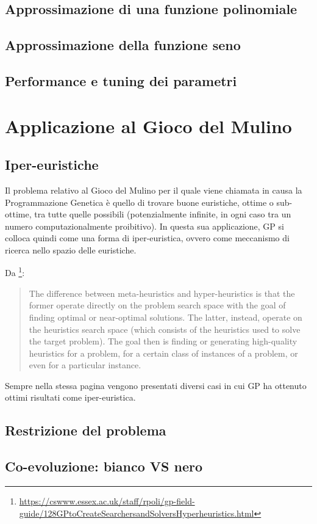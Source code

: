 \documentclass{../llncs}
\begin{document}
\subsection{Approssimazione di una funzione polinomiale}
\subsection{Approssimazione della funzione seno}
\subsection{Performance e tuning dei parametri}

\section{Applicazione al Gioco del Mulino}
\subsection{Iper-euristiche}
Il problema relativo al Gioco del Mulino per il quale viene chiamata in causa la Programmazione Genetica è quello di trovare buone euristiche, ottime o sub-ottime, tra tutte quelle possibili (potenzialmente infinite, in ogni caso tra un numero computazionalmente proibitivo). In questa sua applicazione, GP si colloca quindi come una forma di iper-euristica, ovvero come meccanismo di ricerca nello spazio delle euristiche.

Da \footnote{\url{https://cswww.essex.ac.uk/staff/rpoli/gp-field-guide/128GPtoCreateSearchersandSolversHyperheuristics.html}}:
\begin{quote}
The difference between meta-heuristics and hyper-heuristics is that the former operate directly on the problem search space with the goal of finding optimal or near-optimal solutions. The latter, instead, operate on the heuristics search space (which consists of the heuristics used to solve the target problem). The goal then is finding or generating high-quality heuristics for a problem, for a certain class of instances of a problem, or even for a particular instance.
\end{quote}
Sempre nella stessa pagina vengono presentati diversi casi in cui GP ha ottenuto ottimi risultati come iper-euristica.

\subsection{Restrizione del problema}
\subsection{Co-evoluzione: bianco VS nero}
\end{document}

